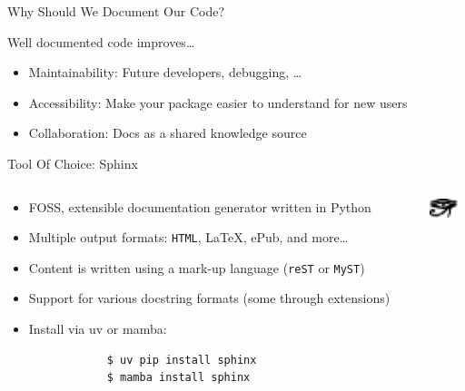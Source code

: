 
\begin{frame}{Why Should We Document Our Code?}
  \begin{center}
    \huge\textcolor{ccyan!90!cblack}{Well documented code improves\dots}
  \end{center}
  \begin{itemize}
    \item Maintainability: Future developers, debugging, \dots
    \item Accessibility: Make your package easier to understand for new users
    \item Collaboration: Docs as a shared knowledge source
  \end{itemize}
\end{frame}

\begin{frame}[fragile]{Tool Of Choice: Sphinx}
  \begin{columns}[t, onlytextwidth]
    \begin{column}{0.68\textwidth}
      \begin{itemize}
        \setlength{\itemsep}{1em}
        \item FOSS, extensible documentation generator written in Python
        \item Multiple output formats: \texttt{HTML}, \LaTeX, ePub, and more\dots
        \item Content is written using a mark-up language (\texttt{reST} or \texttt{MyST})
        \item Support for various docstring formats (some through extensions)
        \item Install via uv or mamba:
          \begin{verbatim}
            $ uv pip install sphinx
            $ mamba install sphinx
          \end{verbatim}
      \end{itemize}
    \end{column}
    \hfill
    \begin{column}{0.38\textwidth}
      \begin{center}
      \includegraphics[width=0.8\textwidth]{logos/sphinx-logo.pdf}
      \end{center}
    \end{column}
  \end{columns}
\end{frame}


